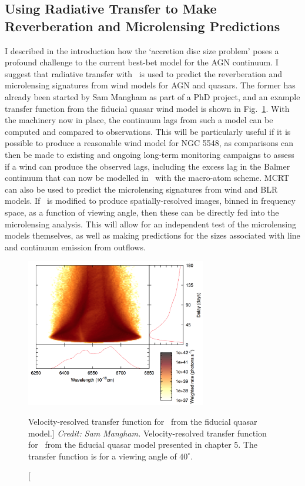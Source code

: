 \subsection{Using Radiative Transfer to Make Reverberation and Microlensing Predictions}

I described in the introduction how the `accretion disc size problem' poses
a profound challenge to the current best-bet model for the AGN continuum.
I suggest that radiative transfer with \py\ is used to predict the 
reverberation and microlensing signatures from wind models for AGN and quasars. 
The former has already been started by Sam Mangham as part of a PhD
project, and an example transfer function from the fiducial quasar wind model
is shown in Fig.~\ref{fig:halpha_transfer}. With the machinery now in place,
the continuum lags from such a model can be computed and compared to observations.
This will be particularly useful if it is possible to produce a reasonable wind
model for NGC 5548, as comparisons can then be made to existing and ongoing long-term monitoring
campaigns \citep[e.g.][]{edelson2015} to assess if a wind can produce the observed 
lags, including the excess lag in the Balmer continuum that can now be modelled 
in \py\ with the macro-atom scheme. MCRT can also be used to predict 
the microlensing signatures from wind and BLR models. If \py\ is modified to produce
spatially-resolved images, binned in frequency space, as a function of viewing 
angle, then these can be directly fed into the microlensing analysis. This will
allow for an independent test of the microlensing models themselves, as well as
making predictions for the sizes associated with line and continuum emission from
outflows.

\begin{figure} 
\centering
\includegraphics[width=0.7\textwidth]{figures/ewpaper/halpha_transfer.png}
\caption
[Velocity-resolved transfer function for \ha\ 
from the fiducial quasar model.]
{
{\sl Credit: Sam Mangham.}
Velocity-resolved transfer function for \ha\ 
from the fiducial quasar model presented in
chapter 5. The transfer function is for a viewing angle of 
$40^\circ$. 
}
\label{fig:halpha_transfer}
\end{figure} 

